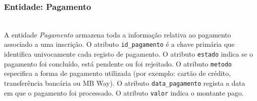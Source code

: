 \documentclass[runningheads]{llncs}
\begin{document}
                    \noindent\begin{minipage}{\textwidth}
                    \subsubsection{Entidade: Pagamento}\mbox{}\\

                    A entidade \textit{Pagamento} armazena toda a informação relativa ao pagamento associado a 
                    uma inscrição. O atributo \texttt{id\_pagamento} é a chave primária que identifica univocamente 
                    cada registo de pagamento. O atributo \texttt{estado} indica se o pagamento foi concluído, 
                    está pendente ou foi rejeitado. O atributo \texttt{metodo} especifica a forma de pagamento 
                    utilizada (por exemplo: cartão de crédito, transferência bancária ou MB Way). O atributo 
                    \texttt{data\_pagamento} regista a data em que o pagamento foi processado. O atributo 
                    \texttt{valor} indica o montante pago.


\end{minipage}
\end{document}
